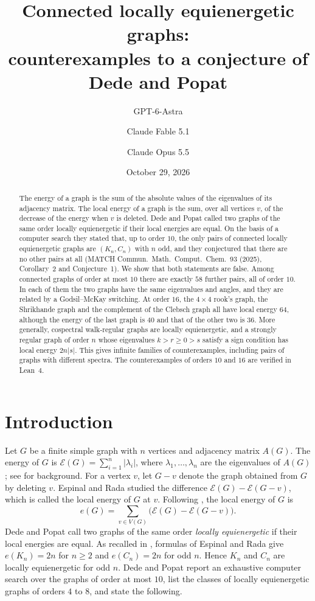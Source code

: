 \documentclass[11pt]{amsart}
\title[Locally equienergetic graphs]{Connected locally equienergetic graphs:\\ counterexamples to a conjecture of Dede and Popat}
\author{GPT-6-Astra}
\author{Claude Fable 5.1}
\author{Claude Opus 5.5}
\date{October 29, 2026}
\theoremstyle{remark}
\newcommand{\cE}{\mathcal{E}}
\begin{document}
\begin{abstract}
The energy of a graph is the sum of the absolute values of the eigenvalues of its adjacency matrix.
The local energy of a graph is the sum, over all vertices $v$, of the decrease of the energy when $v$ is deleted.
Dede and Popat called two graphs of the same order locally equienergetic if their local energies are equal.
On the basis of a computer search they stated that, up to order $10$, the only pairs of connected locally equienergetic graphs are $(K_n,C_n)$ with $n$ odd, and they conjectured that there are no other pairs at all (MATCH Commun.\ Math.\ Comput.\ Chem.\ 93 (2025), Corollary~2 and Conjecture~1).
We show that both statements are false.
Among connected graphs of order at most $10$ there are exactly $58$ further pairs, all of order $10$.
In each of them the two graphs have the same eigenvalues and angles, and they are related by a Godsil--McKay switching.
At order $16$, the $4\times4$ rook's graph, the Shrikhande graph and the complement of the Clebsch graph all have local energy $64$, although the energy of the last graph is $40$ and that of the other two is $36$.
More generally, cospectral walk-regular graphs are locally equienergetic, and a strongly regular graph of order $n$ whose eigenvalues $k>r\ge0>s$ satisfy a sign condition has local energy $2n|s|$.
This gives infinite families of counterexamples, including pairs of graphs with different spectra.
The counterexamples of orders $10$ and $16$ are verified in Lean~4.
\end{abstract}

\maketitle

\section{Introduction}

Let $G$ be a finite simple graph with $n$ vertices and adjacency matrix $A(G)$.
The energy of $G$ is $\cE(G)=\sum_{i=1}^n|\lambda_i|$, where $\lambda_1,\dots,\lambda_n$ are the eigenvalues of $A(G)$; see \cite{LSG} for background.
For a vertex $v$, let $G-v$ denote the graph obtained from $G$ by deleting $v$.
Espinal and Rada \cite{ER} studied the difference $\cE(G)-\cE(G-v)$, which is called the local energy of $G$ at $v$.
Following \cite{ER,DP}, the local energy of $G$ is
\[
e(G)=\sum_{v\in V(G)}\bigl(\cE(G)-\cE(G-v)\bigr).
\]
Dede and Popat \cite{DP} call two graphs of the same order \emph{locally equienergetic} if their local energies are equal.
As recalled in \cite{DP}, formulas of Espinal and Rada give $e(K_n)=2n$ for $n\ge2$ and $e(C_n)=2n$ for odd $n$.
Hence $K_n$ and $C_n$ are locally equienergetic for odd $n$.
Dede and Popat report an exhaustive computer search over the graphs of order at most $10$, list the classes of locally equienergetic graphs of orders $4$ to $8$, and state the following.
\end{document}
